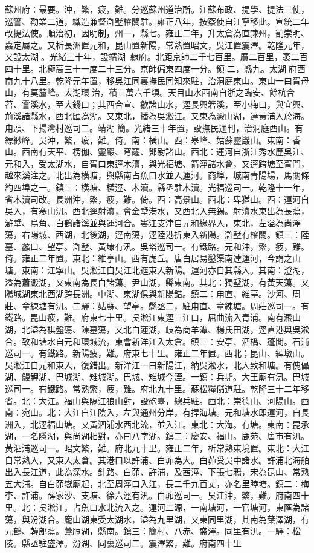 \begin{pinyinscope}
蘇州府：最要。沖，繁，疲，難。分巡蘇州道治所。江蘇布政、提學、提法三使，巡警、勸業二道，織造兼督滸墅榷關駐。雍正八年，按察使自江寧移此。宣統二年改提法使。順治初，因明制，州一，縣七。雍正二年，升太倉為直隸州，割崇明、嘉定屬之。又析長洲置元和，昆山置新陽，常熟置昭文，吳江置震澤。乾隆元年，又設太湖。光緒三十年，設靖湖，隸府。北距京師二千七百里。廣二百里，袤二百四十里。北極高三十一度二十三分。京師偏東四度一分。領二，縣九。太湖府西南九十八里。乾隆元年置，移吳江同裏撫民同知來駐，治洞庭東山。東山一曰胥母山，有莫釐峰。太湖環治，積三萬六千頃。天目山水西南自浙之臨安、餘杭合苕、霅溪水，至大錢口；其西合宣、歙諸山水，逕長興箬溪，至小梅口，與宜興、荊溪諸縣水，西北匯為湖。又東北，播為吳淞江。又東為澱山湖，達黃浦入於海。甪頭、下揚灣村巡司二。靖湖簡。光緒三十年置，設撫民通判，治洞庭西山。有縹緲峰。吳沖，繁，疲，難。倚。南：橫山。西：皋峰、姑蘇靈巖山。東南：香山。西南有天平、楞伽、靈巖、穹窿、鄧尉諸山。西北：運河自浙江秀水歷吳江、元和入，受太湖水，自胥口東逕木瀆，與光福塘、箭涇諸水會，又逕跨塘至胥門，越來溪注之。北出為橫塘，與縣南占魚口水並入運河。商埠，城南青陽場，馬關條約四埠之一。鎮三：橫塘、橫涇、木瀆。縣丞駐木瀆。光福巡司一。乾隆十一年，省木瀆司改。長洲沖，繁，疲，難。倚。西：高景山。西北：卑猶山。西：運河自吳入，有寒山汛。西北逕射瀆，會金墅港水，又西北入無錫。射瀆水東出為長蕩，滸墅、烏角、白鶴諸溪並與運河合。婁江支津自元和緣界入，東北，左溢為尚澤蕩，右陽城、西湖，北後湖，逕南蕩，逕陸港折東入新陽。滸墅有榷關。鎮三：陸墓、蠡口、望亭。滸墅、黃埭有汛。吳塔巡司一。有鐵路。元和沖，繁，疲，難。倚。雍正二年置。東北：維亭山。西有虎丘。唐白居易鑿渠南達運河，今謂之山塘。東南：江寧山。吳淞江自吳江北迤東入新陽。運河亦自其縣入。其南：澄湖，溢為蕭澱湖，又東南為長白諸蕩。尹山湖，縣東南。其北：獨墅湖，有黃天蕩。又陽城湖東北西湖跨長洲。中湖、東湖俱與新陽錯。鎮二：甪直、維亭。沙河、周莊、章練塘有汛。二驛：姑蘇、望亭。縣丞二，駐甪直、章練塘。周莊巡司一。有鐵路。昆山疲，難。府東七十里。吳淞江東逕三江口，屈曲流入青浦。南有澱山湖，北溢為棋盤蕩、陳墓蕩，又北白蓮湖，歧為商羊潭、楊氏田湖，逕直港與吳淞合。致和塘水自元和環城流，東會新洋江入太倉。鎮三：安亭、泗橋、蓬閬。石浦巡司一。有鐵路。新陽疲，難。府東七十里。雍正二年置。西北；昆山、綽墩山。吳淞江自元和東入，復錯出。新洋江一曰新陽江，納吳淞水，北入致和塘。有傀儡湖、鰻鯉湖、巴城湖、雉城湖。巴城、雉城今湮。一鎮：兵墟。大王廟有汛。巴城巡司一。有鐵路。常熟繁，疲，難。府北九十里。蘇松糧儲道駐。乾隆三十二年移省。北：大江。福山與隔江狼山對，設砲臺，總兵駐。西北：崇德山、河陽山。西南：宛山。北：大江自江陰入，左與通州分岸，有捍海塘。元和塘水即運河，自長洲入，北逕福山塘。又黃泗浦水西北流，並入江。東北：大海。有塘。東南：昆承湖，一名隱湖，與尚湖相對，亦曰八字湖。鎮二：慶安、福山。鹿苑、唐市有汛。黃泗浦巡司一。昭文繁，難。府北九十里。雍正二年，析常熟東境置。東北：大江自常熟入，又東入太倉。其港口以許浦、白茆為大。白茆受吳中諸水。許浦北海舶出入長江道，此為深水。針路、白茆、許浦，及茜涇、下張七鴉，宋為昆山、常熟五大浦。自白茆嶽廟起，北至周涇口入江，長二千九百丈，亦名里睦塘。鎮二：梅李、許浦。薛家沙、支塘、徐六涇有汛。白茆巡司一。吳江沖，繁，難。府南四十里。北：吳淞江，占魚口水北流入之。運河二源，一南塘河，一官塘河，東匯為諸蕩，與汾湖合。龐山湖東受太湖水，溢為九里湖，又東同里湖，其南為葉澤湖，有元鶴、韓郎蕩。鶯脰湖，縣南。鎮三：簡村、八赤、盛澤。同里有汛。一驛：松陵。縣丞駐盛澤。汾湖、同裏巡司二。震澤繁，難。府南四十里
\end{pinyinscope}
